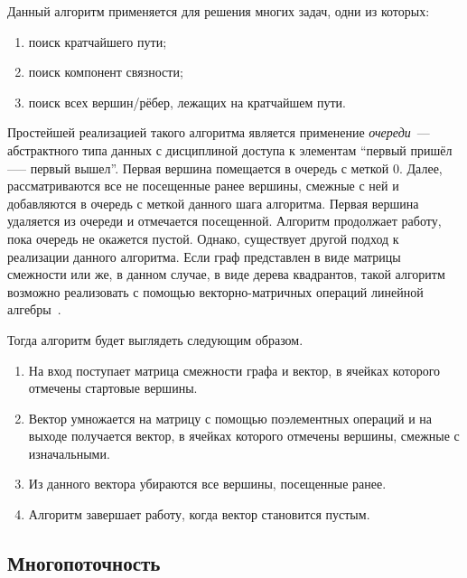 Данный алгоритм применяется для решения многих задач, одни из которых:
\begin{enumerate}
    \item  поиск кратчайшего пути;
    \item  поиск компонент связности;
    \item  поиск всех вершин/рёбер, лежащих на кратчайшем пути.
\end{enumerate}

Простейшей реализацией такого алгоритма является применение \textit{очереди}~--- абстрактного типа данных с дисциплиной доступа к элементам \enquote{первый пришёл --— первый вышел}. Первая вершина помещается в очередь с меткой $0$. Далее, рассматриваются все не посещенные ранее вершины, смежные с ней и добавляются в очередь с меткой данного шага алгоритма. Первая вершина удаляется из очереди и отмечается посещенной. Алгоритм продолжает работу, пока очередь не окажется пустой. Однако, существует другой подход к реализации данного алгоритма. Если граф представлен в виде матрицы смежности или же, в данном случае, в виде дерева квадрантов, такой алгоритм возможно реализовать с помощью векторно-матричных операций линейной алгебры~\cite{davis2018algorithm}. 

Тогда алгоритм будет выглядеть следующим образом.
\begin{enumerate}
    \item  На вход поступает матрица смежности графа и вектор, в ячейках которого отмечены стартовые вершины.
    \item  Вектор умножается на матрицу с помощью поэлементных операций и на выходе получается вектор, в ячейках которого отмечены вершины, смежные с изначальными.
    \item  Из данного вектора убираются все вершины, посещенные ранее.
    \item  Алгоритм завершает работу, когда вектор становится пустым.
\end{enumerate}

\subsection{Многопоточность}

